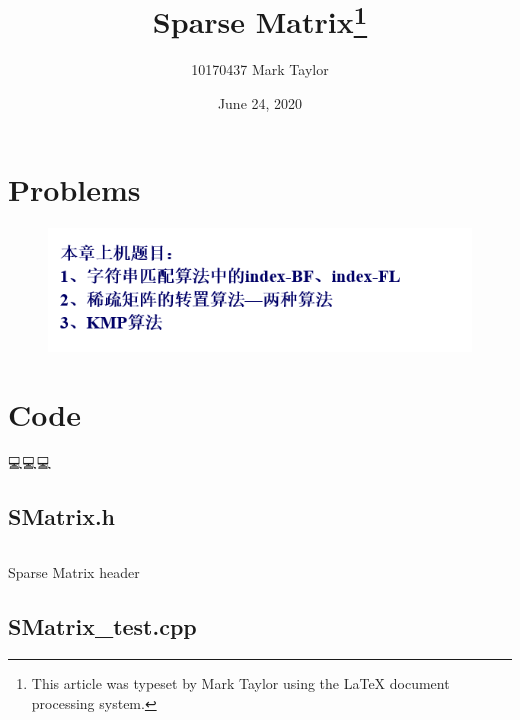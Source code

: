 \documentclass{article}
\begin{document}
	
	
	\title{Sparse Matrix\footnote{
			This article was typeset by Mark Taylor using 
	the \protect\LaTeX{}
			document processing system. }}
	
	\author{10170437 Mark Taylor}
	
	\date{June 24, 2020}
	
	\maketitle
		
	\hypertarget{Contents}{}  %
	\tableofcontents
	
	
	\section{Problems}
	\begin{figure}[!hb]
		\centering
		\includegraphics[width=0.7\linewidth]{img/problems}
		\caption*{}
		\label{fig:problem}
	\end{figure}
	
	\section{Code}
	💻💻💻
	\subsection{SMatrix.h}
%	
	
	\begin{longlisting}
		\inputminted{c++}{src/SMatrix.h}
		\caption{Sparse Matrix header}
		\label{SMatrix.h}
	\end{longlisting}
	
	\subsection{SMatrix\_test.cpp}
%		
	
\end{document}
